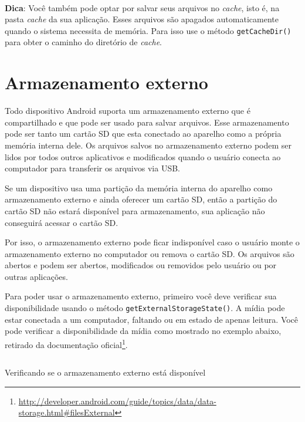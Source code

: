 \documentclass[a4paper,12pt,brazil,oneside]{book}
\begin{document}
\begin{singlespace}
\begin{framed}
\paragraph{}\textbf{Dica}: Você também pode optar por salvar seus arquivos no \emph{cache}, isto é, na pasta \emph{cache} da sua aplicação. Esses arquivos são apagados automaticamente quando o sistema necessita de memória. Para isso use o método \texttt{getCacheDir()} para obter o caminho do diretório de \emph{cache}.
\textit{}
\end{framed}

		\section{Armazenamento externo}

		Todo dispositivo Android suporta um armazenamento externo que é compartilhado e que pode ser usado para salvar arquivos. Esse armazenamento pode ser tanto um cartão SD que esta conectado ao aparelho como a própria memória interna dele. Os arquivos salvos no armazenamento externo podem ser lidos por todos outros aplicativos e modificados quando o usuário conecta ao computador para transferir os arquivos via USB.

		Se um dispositivo usa uma partição da memória interna do aparelho como armazenamento externo e ainda oferecer um cartão SD, então a partição do cartão SD não estará disponível para armazenamento, sua aplicação não conseguirá acessar o cartão SD. 

		Por isso, o armazenamento externo pode ficar indisponível caso o usuário monte o armazenamento externo no computador ou remova o cartão SD. Os arquivos são abertos e podem ser abertos, modificados ou removidos pelo usuário ou por outras aplicações.

		Para poder usar o armazenamento externo, primeiro você deve verificar sua disponibilidade usando o método \texttt{getExternalStorageState()}. A mídia pode estar conectada a um computador, faltando ou em estado de apenas leitura. Você pode verificar a disponibilidade da mídia como mostrado no exemplo abaixo, retirado da documentação oficial\footnote{\href{http://developer.android.com/guide/topics/data/data-storage.html\#filesExternal}{http://developer.android.com/guide/topics/data/data-storage.html\#filesExternal}}.

		\begin{listing}[H]
		\inputminted[linenos=true,fontsize=\small,frame=lines, framesep=2mm, tabsize=2,numbersep=5pt]{java}{src/api/storage/external1.java}
		\caption{Verificando se o armazenamento externo está disponível}
		\label{code:external1}
		\end{listing} 	


\end{singlespace}
\end{document}
